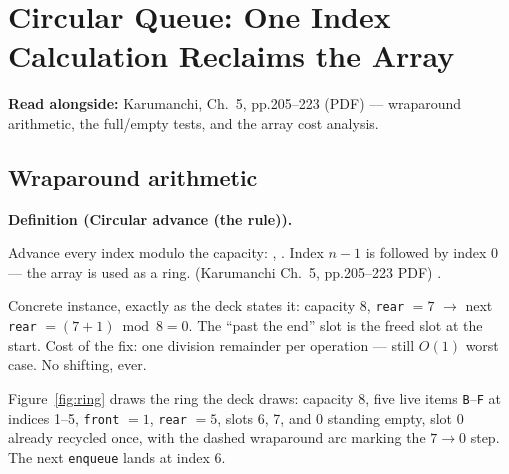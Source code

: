 \documentclass[11pt]{article}
\newenvironment{definitionbox}[1]{%
  \par\noindent\textbf{Definition (#1).}\ \itshape
}{\par\vspace{0.3em}}
\begin{document}
\section{Circular Queue: One Index Calculation Reclaims the Array}

\textbf{Read alongside:} Karumanchi, Ch.~5, pp.205--223 (PDF) --- wraparound arithmetic, the full/empty tests, and the array cost analysis.

\subsection{Wraparound arithmetic}

\begin{definitionbox}{Circular advance (the rule)}
Advance every index modulo the capacity: , . Index $n - 1$ is followed by index $0$ --- the array is used as a ring. (Karumanchi Ch.~5, pp.205--223 PDF) \cite{Karumanchi2017_data_structures_algorithms_made_easy}.
\end{definitionbox}

Concrete instance, exactly as the deck states it: capacity $8$, \texttt{rear} $= 7$ $\to$ next \texttt{rear} $= (7 + 1) \bmod 8 = 0$. The ``past the end'' slot is the freed slot at the start. Cost of the fix: one division remainder per operation --- still $O(1)$ worst case. No shifting, ever.

Figure~\ref{fig:ring} draws the ring the deck draws: capacity 8, five live items \texttt{B}--\texttt{F} at indices 1--5, \texttt{front} $= 1$, \texttt{rear} $= 5$, slots 6, 7, and 0 standing empty, slot $0$ already recycled once, with the dashed wraparound arc marking the $7 \to 0$ step. The next \texttt{enqueue} lands at index $6$.
\end{document}
